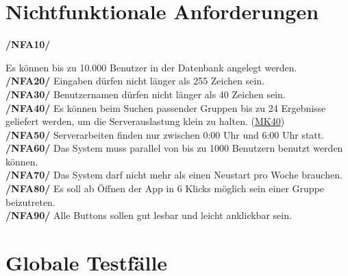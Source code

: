 \documentclass[a4paper]{scrreprt}
\begin{document}
\chapter{Nichtfunktionale Anforderungen}

\begin{addmargin}[25pt]{0pt} 

\hypertarget{nfa10}{\textbf{/NFA10/}} Es können bis zu 10.000 Benutzer in der Datenbank angelegt werden.\\
\hypertarget{nfa20}{\textbf{/NFA20/}} Eingaben dürfen nicht länger als 255 Zeichen sein.\\
\hypertarget{nfa30}{\textbf{/NFA30/}} Benutzernamen dürfen nicht länger als 40 Zeichen sein.\\
\hypertarget{nfa40}{\textbf{/NFA40/}} Es können beim Suchen passender Gruppen bis zu 24 Ergebnisse geliefert werden, um die Serverauslastung klein zu halten. (\hyperlink{m40}{MK40})\\
\hypertarget{nfa50}{\textbf{/NFA50/}} Serverarbeiten finden nur zwischen 0:00 Uhr und 6:00 Uhr statt.\\
\hypertarget{nfa60}{\textbf{/NFA60/}} Das System muss parallel von bis zu 1000 Benutzern benutzt werden können.\\
\hypertarget{nfa70}{\textbf{/NFA70/}} Das System darf nicht mehr als einen Neustart pro Woche brauchen.\\
\hypertarget{nfa80}{\textbf{/NFA80/}} Es soll ab Öffnen der App in 6 Klicks möglich sein einer Gruppe beizutreten.\\
\hypertarget{nfa90}{\textbf{/NFA90/}} Alle Buttons sollen gut lesbar und leicht anklickbar sein.\\

\end{addmargin}


\chapter{Globale Testfälle}
\end{document}
